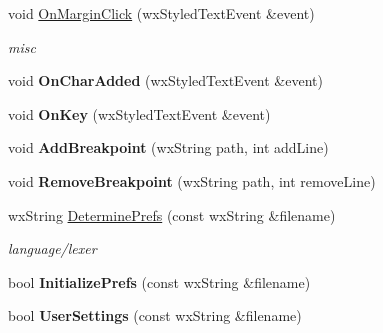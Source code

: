 \begin{DoxyCompactItemize}
\item 
\hypertarget{class_edit_ab02764c433061f10bfc4b66c0662c014}{void \hyperlink{class_edit_ab02764c433061f10bfc4b66c0662c014}{On\+Margin\+Click} (wx\+Styled\+Text\+Event \&event)}\label{class_edit_ab02764c433061f10bfc4b66c0662c014}

\begin{DoxyCompactList}\small\item\em misc \end{DoxyCompactList}\item 
\hypertarget{class_edit_acfd8c8e7e830f6417f7b2a60c13a44c9}{void {\bfseries On\+Char\+Added} (wx\+Styled\+Text\+Event \&event)}\label{class_edit_acfd8c8e7e830f6417f7b2a60c13a44c9}

\item 
\hypertarget{class_edit_aa81c0098ff533b01c17f1d49d63a3122}{void {\bfseries On\+Key} (wx\+Styled\+Text\+Event \&event)}\label{class_edit_aa81c0098ff533b01c17f1d49d63a3122}

\item 
\hypertarget{class_edit_a84aa2d6a1789d6eb223cf410c2cd75ee}{void {\bfseries Add\+Breakpoint} (wx\+String path, int add\+Line)}\label{class_edit_a84aa2d6a1789d6eb223cf410c2cd75ee}

\item 
\hypertarget{class_edit_aae5ca34dcf1a83e592d346ec18387d4e}{void {\bfseries Remove\+Breakpoint} (wx\+String path, int remove\+Line)}\label{class_edit_aae5ca34dcf1a83e592d346ec18387d4e}

\item 
\hypertarget{class_edit_ad3fe918901eba29c8626ea340b8ecb20}{wx\+String \hyperlink{class_edit_ad3fe918901eba29c8626ea340b8ecb20}{Determine\+Prefs} (const wx\+String \&filename)}\label{class_edit_ad3fe918901eba29c8626ea340b8ecb20}

\begin{DoxyCompactList}\small\item\em language/lexer \end{DoxyCompactList}\item 
\hypertarget{class_edit_ace7f1699b31d98f6a65b6c8a5d7a1e7a}{bool {\bfseries Initialize\+Prefs} (const wx\+String \&filename)}\label{class_edit_ace7f1699b31d98f6a65b6c8a5d7a1e7a}

\item 
\hypertarget{class_edit_a4aabee0c58f1a7d5c06a6d84f53e9dd3}{bool {\bfseries User\+Settings} (const wx\+String \&filename)}\label{class_edit_a4aabee0c58f1a7d5c06a6d84f53e9dd3}


\end{DoxyCompactItemize}
